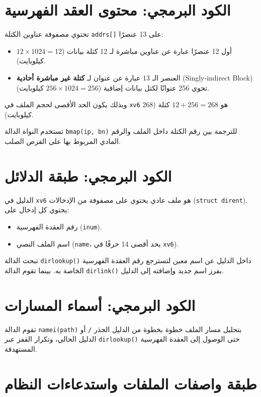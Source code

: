 \section{الكود البرمجي: محتوى العقد الفهرسية}
\label{sec:code_inode_content}

تحتوي مصفوفة عناوين الكتلة \texttt{addrs[]} على 13 عنصرًا:
\begin{itemize}
  \item أول 12 عنصرًا عبارة عن عناوين مباشرة لـ 12 كتلة بيانات ($12 \times 1024 = 12$ كيلوبايت).
  \item العنصر الـ 13 عبارة عن عنوان لـ \textbf{كتلة غير مباشرة أحادية} (Singly-indirect Block) تحوي 256 عنوانًا لكتل بيانات إضافية ($256 \times 1024 = 256$ كيلوبايت).
\end{itemize}
وبذلك يكون الحد الأقصى لحجم الملف في \texttt{xv6} هو $12 + 256 = 268$ كتلة (268 كيلوبايت).

تستخدم النواة الدالة \texttt{bmap(ip, bn)} للترجمة بين رقم الكتلة داخل الملف والرقم المادي المربوط بها على القرص الصلب.

\section{الكود البرمجي: طبقة الدلائل}
\label{sec:code_directory_layer}

الدليل في \texttt{xv6} هو ملف عادي يحتوي على مصفوفة من الإدخالات (\texttt{struct dirent}).
يحتوي كل إدخال على:
\begin{itemize}
  \item رقم العقدة الفهرسية (\texttt{inum}).
  \item اسم الملف النصي (\texttt{name}، بحد أقصى 14 حرفًا في \texttt{xv6}).
\end{itemize}

تبحث الدالة \texttt{dirlookup()} داخل الدليل عن اسم معين لتسترجع رقم العقدة الفهرسية الخاصة به. بينما تقوم الدالة \texttt{dirlink()} بفرز اسم جديد وإضافته إلى الدليل.

\section{الكود البرمجي: أسماء المسارات}
\label{sec:code_path_names}

تقوم الدالة \texttt{namei(path)} بتحليل مسار الملف خطوة بخطوة من الدليل الجذر \texttt{/} أو الدليل الحالي، وتكرار القفز عبر \texttt{dirlookup()} حتى الوصول إلى العقدة الفهرسية المستهدفة.

\section{طبقة واصفات الملفات واستدعاءات النظام}
\label{sec:file_descriptor_layer}

